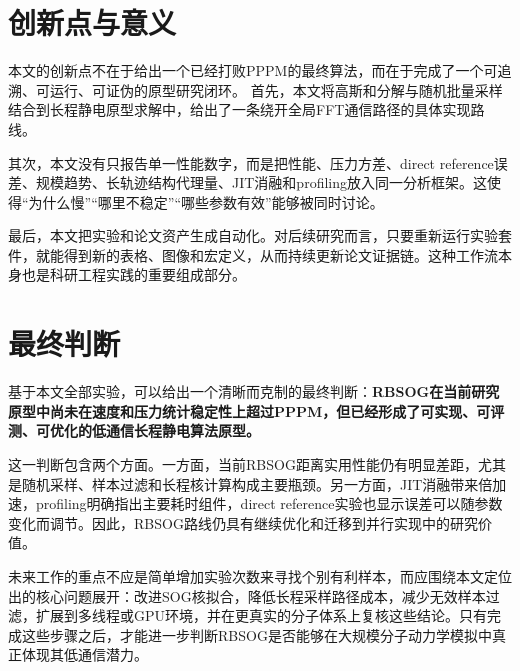 \section{创新点与意义}

本文的创新点不在于给出一个已经打败PPPM的最终算法，而在于完成了一个可追溯、可运行、可证伪的原型研究闭环。
首先，本文将高斯和分解与随机批量采样结合到长程静电原型求解中，给出了一条绕开全局FFT通信路径的具体实现路线。

其次，本文没有只报告单一性能数字，而是把性能、压力方差、direct reference误差、规模趋势、长轨迹结构代理量、JIT消融和profiling放入同一分析框架。这使得“为什么慢”“哪里不稳定”“哪些参数有效”能够被同时讨论。

最后，本文把实验和论文资产生成自动化。对后续研究而言，只要重新运行实验套件，就能得到新的表格、图像和宏定义，从而持续更新论文证据链。这种工作流本身也是科研工程实践的重要组成部分。

\section{最终判断}

基于本文全部实验，可以给出一个清晰而克制的最终判断：\textbf{RBSOG在当前研究原型中尚未在速度和压力统计稳定性上超过PPPM，但已经形成了可实现、可评测、可优化的低通信长程静电算法原型。}

这一判断包含两个方面。一方面，当前RBSOG距离实用性能仍有明显差距，尤其是随机采样、样本过滤和长程核计算构成主要瓶颈。另一方面，JIT消融带来\JITSpeedup 倍加速，profiling明确指出主要耗时组件，direct reference实验也显示误差可以随参数变化而调节。因此，RBSOG路线仍具有继续优化和迁移到并行实现中的研究价值。

未来工作的重点不应是简单增加实验次数来寻找个别有利样本，而应围绕本文定位出的核心问题展开：改进SOG核拟合，降低长程采样路径成本，减少无效样本过滤，扩展到多线程或GPU环境，并在更真实的分子体系上复核这些结论。只有完成这些步骤之后，才能进一步判断RBSOG是否能够在大规模分子动力学模拟中真正体现其低通信潜力。
